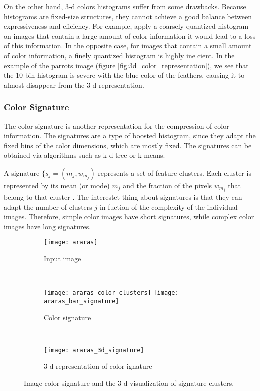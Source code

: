 On the other hand, 3-d colors histograms suffer from some drawbacks. Because histograms are fixed-size structures, they cannot achieve a good balance between expressiveness and eficiency. For example, apply a coarsely quantized histogram on images that contain a large amount of color information it would lead to a loss of this information. In the opposite case, for images that contain a small amount of color information, a finely quantized histogram is highly inecient. In the example of the parrots image (figure \ref{fig:3d_color_representation}), we see that the 10-bin histogram is severe with the blue color of the feathers, causing it to almost disappear from the 3-d representation. 








\subsubsection{Color Signature}

The color signature is another representation for the compression of color information. The signatures are a type of boosted histogram, since they adapt the fixed bins of the color dimensions, which are mostly fixed. The signatures can be obtained via algorithms such as k-d tree or k-means. 

A signature $\{s_j = (m_j, w_{m_j})$ represents a set of feature clusters. Each cluster is represented by its mean (or mode) $m_j$ and the fraction of the pixels $w_{m_j}$ that belong to that cluster \citep{Rubner.Tomasi:Book:2001}. The interestet thing about signatures is that they can adapt the number of clusters $j$ in fuction of the complexity of the individual images. Therefore, simple color images have short signatures, while complex color images have long signatures. 


\begin{figure}[!ht]
    \centering
    \begin{subfigure}[b]{0.25\textwidth}
        \texttt{[image: araras]}
        \caption{Input image}
    \end{subfigure} \\
    
    \begin{subfigure}[b]{0.4\textwidth}
    	\texttt{[image: araras\_color\_clusters]}
        \texttt{[image: araras\_bar\_signature]}
        \caption{Color signature}
    \end{subfigure}
    	~ %
    \begin{subfigure}[b]{0.5\textwidth}
        \texttt{[image: araras\_3d\_signature]}
        \caption{3-d representation of color ignature}
    \end{subfigure} 
    	    
    \caption{Image color signature and the 3-d visualization of signature clusters.}\label{fig:color_signature}    
\end{figure}

